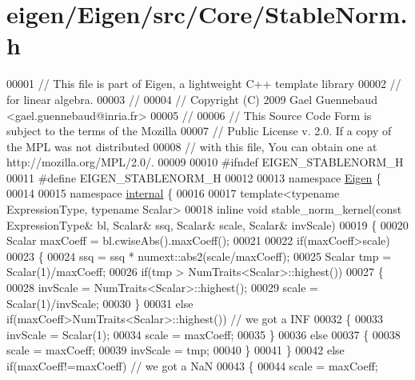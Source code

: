 \hypertarget{eigen_2_eigen_2src_2_core_2_stable_norm_8h_source}{}\section{eigen/\+Eigen/src/\+Core/\+Stable\+Norm.h}
\label{eigen_2_eigen_2src_2_core_2_stable_norm_8h_source}

\begin{DoxyCode}
00001 \textcolor{comment}{// This file is part of Eigen, a lightweight C++ template library}
00002 \textcolor{comment}{// for linear algebra.}
00003 \textcolor{comment}{//}
00004 \textcolor{comment}{// Copyright (C) 2009 Gael Guennebaud <gael.guennebaud@inria.fr>}
00005 \textcolor{comment}{//}
00006 \textcolor{comment}{// This Source Code Form is subject to the terms of the Mozilla}
00007 \textcolor{comment}{// Public License v. 2.0. If a copy of the MPL was not distributed}
00008 \textcolor{comment}{// with this file, You can obtain one at http://mozilla.org/MPL/2.0/.}
00009 
00010 \textcolor{preprocessor}{#ifndef EIGEN\_STABLENORM\_H}
00011 \textcolor{preprocessor}{#define EIGEN\_STABLENORM\_H}
00012 
00013 \textcolor{keyword}{namespace }\hyperlink{namespace_eigen}{Eigen} \{ 
00014 
00015 \textcolor{keyword}{namespace }\hyperlink{namespaceinternal}{internal} \{
00016 
00017 \textcolor{keyword}{template}<\textcolor{keyword}{typename} ExpressionType, \textcolor{keyword}{typename} Scalar>
00018 \textcolor{keyword}{inline} \textcolor{keywordtype}{void} stable\_norm\_kernel(\textcolor{keyword}{const} ExpressionType& bl, Scalar& ssq, Scalar& scale, Scalar& invScale)
00019 \{
00020   Scalar maxCoeff = bl.cwiseAbs().maxCoeff();
00021   
00022   \textcolor{keywordflow}{if}(maxCoeff>scale)
00023   \{
00024     ssq = ssq * numext::abs2(scale/maxCoeff);
00025     Scalar tmp = Scalar(1)/maxCoeff;
00026     \textcolor{keywordflow}{if}(tmp > NumTraits<Scalar>::highest())
00027     \{
00028       invScale = NumTraits<Scalar>::highest();
00029       scale = Scalar(1)/invScale;
00030     \}
00031     \textcolor{keywordflow}{else} \textcolor{keywordflow}{if}(maxCoeff>NumTraits<Scalar>::highest()) \textcolor{comment}{// we got a INF}
00032     \{
00033       invScale = Scalar(1);
00034       scale = maxCoeff;
00035     \}
00036     \textcolor{keywordflow}{else}
00037     \{
00038       scale = maxCoeff;
00039       invScale = tmp;
00040     \}
00041   \}
00042   \textcolor{keywordflow}{else} \textcolor{keywordflow}{if}(maxCoeff!=maxCoeff) \textcolor{comment}{// we got a NaN}
00043   \{
00044     scale = maxCoeff;

\end{DoxyCode}

